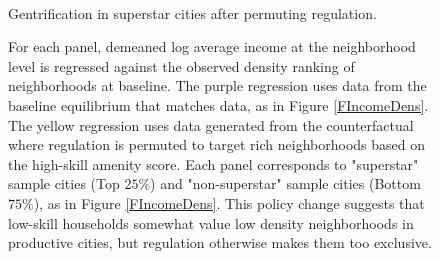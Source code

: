 \documentclass[12pt]{article}
\begin{document}
	\begin{figure}[htbp!]
	
	\caption{ \\ Gentrification in superstar cities after permuting regulation.}\label{figure:gentrification_optPolicy}
	
	\caption*{For each panel, demeaned log average income at the neighborhood level is regressed against the observed density ranking of neighborhoods at baseline. The purple regression uses data from the baseline equilibrium that matches data, as in Figure \ref{FIncomeDens}. The yellow regression uses data generated from the counterfactual where regulation is permuted to target rich neighborhoods based on the high-skill amenity score. Each panel corresponds to "superstar" sample cities (Top $25 \%$) and "non-superstar" sample cities (Bottom $75 \%$), as in Figure \ref{FIncomeDens}. This policy change suggests that low-skill households somewhat value low density neighborhoods in productive cities, but regulation otherwise makes them too exclusive.}
	
\end{figure}

	
	
	
\end{document}
